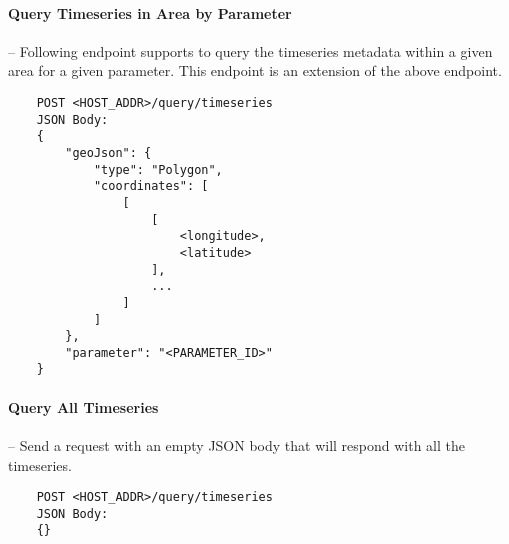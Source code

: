 \paragraph{Query Timeseries in Area by Parameter}-- Following endpoint supports to query the timeseries metadata within a given area for a given parameter. This endpoint is an extension of the above endpoint.

\begin{minipage}{\linewidth}
\begin{lstlisting}
    POST <HOST_ADDR>/query/timeseries
    JSON Body:
    {
        "geoJson": {
            "type": "Polygon",
            "coordinates": [
                [
                    [
                        <longitude>,
                        <latitude>
                    ],
                    ...
                ]
            ]
        },
        "parameter": "<PARAMETER_ID>"
    }
\end{lstlisting}
\end{minipage}

\paragraph{Query All Timeseries} -- Send a request with an empty JSON body that will respond with all the timeseries.
\begin{lstlisting}
    POST <HOST_ADDR>/query/timeseries
    JSON Body:
    {}
\end{lstlisting}
